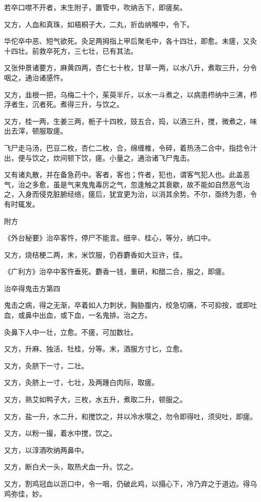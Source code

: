 \documentclass[12pt,UTF8]{ctexbook}
\begin{document}
若卒口噤不开者，末生附子，置管中，吹纳舌下，即瘥矣。

又方，人血和真珠，如梧桐子大，二丸，折齿纳喉中，令下。

华佗卒中恶、短气欲死。灸足两拇指上甲后聚毛中，各十四壮，即愈。未瘥，又灸十四壮。前救卒死方，三七壮，已有其法。

又张仲景诸要方，麻黄四两，杏仁七十枚，甘草一两，以水八升，煮取三升，分令咽之，通治诸感忤。

又方，韭根一把，乌梅二十个，茱萸半斤，以水一斗煮之，以病患栉纳中三沸，栉浮者生，沉者死。煮得三升，与饮之。

又方，桂一两，生姜三两，栀子十四枚，豉五合，捣，以酒三升，搅，微煮之，味出去滓，顿服取瘥。

飞尸走马汤，巴豆二枚，杏仁二枚，合，绵缠椎，令碎，着热汤二合中，指捻令汁出，便与饮之，炊间顿下饮，瘥。小量之，通治诸飞尸鬼击。

又有诸丸散，并在备急药中。客者，客也；忤者，犯也，谓客气犯人也。此盖恶气，治之多愈，虽是气来鬼鬼毒厉之气，忽逢触之其衰歇，故不能如自然恶气治之，入身而侵克脏腑经络，瘥后，犹宜更为治，以消其余势。不尔，亟终为患，令有时辄发。

附方

《外台秘要》治卒客忤，停尸不能言。细辛、桂心，等分，纳口中。

又方，烧桔梗二两，末，米饮服，仍吞麝香如大豆许，佳。

《广利方》治卒中客忤垂死。麝香一钱，重研，和醋二合，服之，即瘥。

治卒得鬼击方第四

鬼击之病，得之无渐，卒着如人力刺状，胸胁腹内，绞急切痛，不可抑按，或即吐血，或鼻中出血，或下血，一名鬼排。治之方。

灸鼻下人中一壮，立愈。不瘥，可加数壮。

又方，升麻、独活、牡桂，分等。末，酒服方寸匕，立愈。

又方，灸脐下一寸，二壮。

又方，灸脐上一寸，七壮，及两踵白肉际，取瘥。

又方，熟艾如鸭子大，三枚，水五升，煮取二升，顿服之。

又方，盐一升，水二升，和搅饮之，并以冷水噀之，勿令即得吐，须臾吐，即瘥。

又方，以粉一撮，着水中搅，饮之。

又方，以淳酒吹纳两鼻中。

又方，断白犬一头，取热犬血一升。饮之。

又方，割鸡冠血以沥口中，令一咽，仍破此鸡，以搨心下，冷乃弃之于道边。得乌鸡弥佳，妙。
\end{document}

